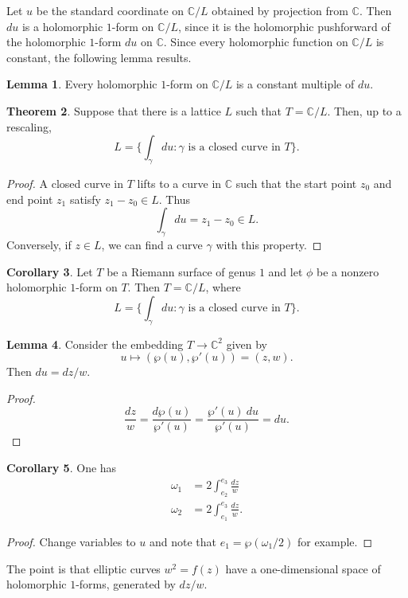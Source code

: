 \documentclass[12pt]{report}
\newcommand{\CC}{\mathbb{C}}
\theoremstyle{definition}
\newtheorem{theorem}{Theorem}[chapter]
\newtheorem{lemma}[theorem]{Lemma}
\newtheorem{corollary}[theorem]{Corollary}
\begin{document}
Let $u$ be the standard coordinate on $\CC/L$ obtained by projection from $\CC$.
Then $du$ is a holomorphic $1$-form on $\CC/L$, since it is the holomorphic pushforward of the holomorphic $1$-form $du$ on $\CC$.
Since every holomorphic function on $\CC/L$ is constant, the following lemma results.
\begin{lemma}
Every holomorphic $1$-form on $\CC/L$ is a constant multiple of $du$.
\end{lemma}
\begin{theorem}
Suppose that there is a lattice $L$ such that $T = \CC/L$.
Then, up to a rescaling,
$$L = \{\int_\gamma du: \gamma \text{ is a closed curve in } T\}.$$
\end{theorem}
\begin{proof}
A closed curve in $T$ lifts to a curve in $\CC$ such that the start point $z_0$ and end point $z_1$ satisfy $z_1 - z_0 \in L$. Thus
$$\int_\gamma du = z_1 - z_0 \in L.$$
Conversely, if $z \in L$, we can find a curve $\gamma$ with this property.
\end{proof}
\begin{corollary}
Let $T$ be a Riemann surface of genus $1$ and let $\phi$ be a nonzero holomorphic $1$-form on $T$. Then $T = \CC/L$, where
$$L = \{\int_\gamma du: \gamma \text{ is a closed curve in } T\}.$$
\end{corollary}
\begin{lemma}
Consider the embedding $T \to \CC^2$ given by
$$u \mapsto (\wp(u), \wp'(u)) = (z, w).$$
Then $du = dz/w$.
\end{lemma}
\begin{proof}
$$\frac{dz}{w} = \frac{d\wp(u)}{\wp'(u)} = \frac{\wp'(u)~du}{\wp'(u)} = du.$$
\end{proof}
\begin{corollary}
One has
\begin{align*}
\omega_1 &= 2\int_{e_2}^{e_3}\frac{dz}{w}\\
\omega_2 &= 2\int_{e_1}^{e_3}\frac{dz}{w}.
\end{align*}
\end{corollary}
\begin{proof}
Change variables to $u$ and note that $e_1 = \wp(\omega_1/2)$ for example.
\end{proof}
The point is that elliptic curves $w^2 = f(z)$ have a one-dimensional space of holomorphic $1$-forms, generated by $dz/w$.
\end{document}
